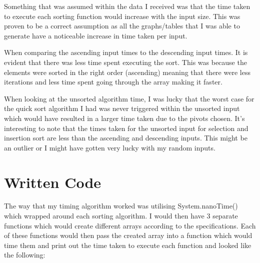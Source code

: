\documentclass[oneside, a4paper]{article}
\begin{document}
Something that was assumed within the data I received was that the time taken to execute each sorting function would increase with the input size. This was proven to be a correct assumption as all the graphs/tables that I was able to generate have a noticeable increase in time taken per input.

When comparing the ascending input times to the descending input times. It is evident that there was less time spent executing the sort. This was because the elements were sorted in the right order (ascending) meaning that there were less iterations and less time spent going through the array making it faster. 

When looking at the unsorted algorithm time, I was lucky that the worst case for the quick sort algorithm I had was never triggered within the unsorted input which would have resulted in a larger time taken due to the pivots chosen. It’s interesting to note that the times taken for the unsorted input for selection and insertion sort are less than the ascending and descending inputs. This might be an outlier or I might have gotten very lucky with my random inputs.

\section{Written Code}
The way that my timing algorithm worked was utilising System.nanoTime() which wrapped around each sorting algorithm. I would then have 3 separate functions which would create different arrays according to the specifications. Each of these functions would then pass the created array into a function which would time them and print out the time taken to execute each function and looked like the following:
\end{document}
